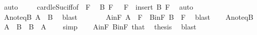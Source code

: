 \begin{isabellebody}
\ auto\isanewline
\ \ \isamarkupfalse%
\ {}\ card{\isacharunderscore}{\kern0pt}le{\isacharunderscore}{\kern0pt}Suc{\isacharunderscore}{\kern0pt}iff{\isacharbrackleft}{\kern0pt}of\ {}\ F{\isacharprime}{\kern0pt}{\isacharbrackright}{\kern0pt}\ \isamarkupfalse%
\ B\ F{\isacharprime}{\kern0pt}{\isacharprime}{\kern0pt}\ \ {}{\isacharcolon}{\kern0pt}\ {\isachardoublequoteopen}F{\isacharprime}{\kern0pt}\ {\isacharequal}{\kern0pt}\ insert\ B\ F{\isacharprime}{\kern0pt}{\isacharprime}{\kern0pt}{\isachardoublequoteclose}\ \isamarkupfalse%
\ auto\isanewline
\ \ \isamarkupfalse%
\ {}\ {}\ \isamarkupfalse%
\ A{\isacharunderscore}{\kern0pt}noteq{\isacharunderscore}{\kern0pt}B{\isacharcolon}{\kern0pt}\ {\isachardoublequoteopen}A\ {\isasymnoteq}\ B{\isachardoublequoteclose}\ \isamarkupfalse%
\ blast\isanewline
\ \ \isamarkupfalse%
\ {}\ {}\ \isamarkupfalse%
\ A{\isacharunderscore}{\kern0pt}in{\isacharunderscore}{\kern0pt}F{\isacharcolon}{\kern0pt}\ {\isachardoublequoteopen}A\ {\isasymin}\ F{\isachardoublequoteclose}\ \ B{\isacharunderscore}{\kern0pt}in{\isacharunderscore}{\kern0pt}F{\isacharcolon}{\kern0pt}\ {\isachardoublequoteopen}B\ {\isasymin}\ F{\isachardoublequoteclose}\ \isamarkupfalse%
\ blast{\isacharplus}{\kern0pt}\isanewline
\ \ \isamarkupfalse%
\ A{\isacharunderscore}{\kern0pt}noteq{\isacharunderscore}{\kern0pt}B\ \isamarkupfalse%
\ {\isachardoublequoteopen}{\isacharparenleft}{\kern0pt}A\ {\isacharminus}{\kern0pt}\ B{\isacharparenright}{\kern0pt}\ {\isasymunion}\ {\isacharparenleft}{\kern0pt}B\ {\isacharminus}{\kern0pt}\ A{\isacharparenright}{\kern0pt}\ {\isasymnoteq}\ {\isacharbraceleft}{\kern0pt}{\isacharbraceright}{\kern0pt}{\isachardoublequoteclose}\ \isamarkupfalse%
\ simp\isanewline
\ \ \isamarkupfalse%
\ A{\isacharunderscore}{\kern0pt}in{\isacharunderscore}{\kern0pt}F\ B{\isacharunderscore}{\kern0pt}in{\isacharunderscore}{\kern0pt}F\ that\ \isamarkupfalse%
\ thesis\ \isamarkupfalse%
\ blast\isanewline
{}\isamarkupfalse%
%
\endisatagproof
{\isafoldproof}%
%
\isadelimproof
\isanewline
%
\endisadelimproof
%
\isadelimtheory
\isanewline
%
\endisadelimtheory
%
\isatagtheory
{}\isamarkupfalse%
%
\endisatagtheory
{\isafoldtheory}%
%
\isadelimtheory
%
\endisadelimtheory
%
\end{isabellebody}%
